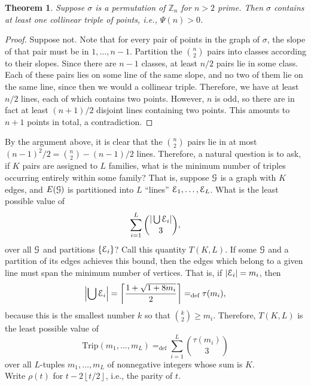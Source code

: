 \documentclass[12pt]{article}
\newtheorem{theorem}{Theorem}
\newcommand{\df}{\ensuremath{\textrm{def}}}
\newcommand{\floor}[1]{\ensuremath{\left \lfloor {#1} \right \rfloor}}
\newcommand{\ceil}[1]{\ensuremath{\left \lceil {#1} \right \rceil}}
\newcommand{\trip}[1]{\ensuremath{\textrm{Trip} \! \left( {#1} \right )}}
\newcommand{\Z}{{\mathbb Z}}
\newcommand{\cE}{{\cal E}}
\newcommand{\cG}{{\cal G}}
\begin{document}
\begin{theorem} \label{onetriplethm} Suppose $\sigma$ is a permutation of $\Z_n$ for $n>2$ prime.  Then $\sigma$ contains at least one collinear triple of points, i.e., $\Psi(n) > 0$.
\end{theorem}
\begin{proof} Suppose not.  Note that for every pair of points in the graph of $\sigma$, the slope of that pair must be in $1, \ldots, n-1$.  Partition the $\binom{n}{2}$ pairs into classes according to their slopes.  Since there are $n-1$ classes, at least $n/2$ pairs lie in some class.  Each of these pairs lies on some line of the same slope, and no two of them lie on the same line, since then we would a collinear triple.  Therefore, we have at least $n/2$ lines, each of which contains two points.  However, $n$ is odd, so there are in fact at least $(n+1)/2$ disjoint lines containing two points.  This amounts to $n+1$ points in total, a contradiction.
\end{proof}

By the argument above, it is clear that the $\binom{n}{2}$ pairs lie in at most $(n-1)^2/2 = \binom{n}{2} - (n-1)/2$ lines.  Therefore, a natural question is to ask, if $K$ pairs are assigned to $L$ families, what is the minimum number of triples occurring entirely within some family?  That is, suppose $\cG$ is a graph with $K$ edges, and $E(\cG)$ is partitioned into $L$ ``lines'' $\cE_1,\ldots,\cE_L$.  What is the least possible value of
$$
\sum_{i=1}^L \binom{|\bigcup \cE_i|}{3},
$$
over all $\cG$ and partitions $\{\cE_i\}$?  Call this quantity $T(K,L)$.  If some $\cG$ and a partition of its edges achieves this bound, then the edges which belong to a given line must span the minimum number of vertices.  That is, if $|\cE_i| = m_i$, then
$$
\left|\bigcup \cE_i \right| = \ceil{\frac{1+\sqrt{1 + 8m_i}}{2}} =_\df \tau(m_i),
$$
because this is the smallest number $k$ so that $\binom{k}{2} \geq m_i$.  Therefore, $T(K,L)$ is the least possible value of
$$
\trip{m_1,\ldots,m_L} =_\df \sum_{i=1}^L \binom{\tau(m_i)}{3}
$$
over all $L$-tuples $m_1,\ldots,m_L$ of nonnegative integers whose sum is $K$.\\


Write $\rho(t)$ for $t - 2 \floor{t/2}$, i.e., the parity of $t$.
\end{document}
